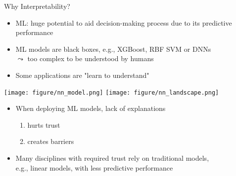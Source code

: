 \documentclass[10pt,compress,t,notes=noshow, xcolor=table]{beamer}
\begin{document}
\begin{frame}{Why Interpretability?}

\begin{splitVCC}[0.8]{
\begin{itemize}
    \item ML: huge potential to aid decision-making process due to its predictive performance
    \item ML models are black boxes, e.g., XGBoost, RBF SVM or DNNs \\ 
    $\leadsto$ too complex to be understood by humans
    \item Some applications are "learn to understand"
\end{itemize}
}
{
    \centering
    \texttt{[image: figure/nn\_model.png]}
    \texttt{[image: figure/nn\_landscape.png]}
}
\end{splitVCC}
\begin{itemize}
    \item<2-> When deploying ML models, lack of explanations 
    \begin{enumerate}
        \item hurts trust
        \item creates barriers
    \end{enumerate}
    \item<2->[\,$\leadsto$] Many disciplines with required trust rely on traditional models,\\ e.g., linear models, with less predictive performance 


\end{itemize}
\end{frame}
\end{document}
